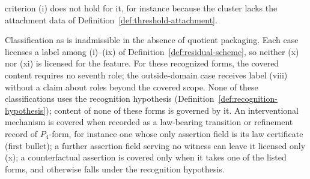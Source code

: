 \begin{proposition}
\begin{itemize}[topsep=2pt,itemsep=1pt]
    criterion (i) does not hold for it, for instance because the cluster lacks
    the attachment data of Definition~\ref{def:threshold-attachment}.
\end{itemize}
Classification as \Pfive{} is inadmissible in the absence of quotient
packaging. Each case licenses a label among (i)--(ix) of
Definition~\ref{def:residual-scheme}, so neither (x) nor (xi) is licensed for
the feature. For these recognized forms, the covered content requires no
seventh role; the outside-domain case receives label (viii) without a claim
about roles beyond the covered scope. None of these classifications uses the
recognition hypothesis (Definition~\ref{def:recognition-hypothesis}); content
of none of these forms is governed by it. An interventional mechanism is covered
when recorded as a law-bearing transition or refinement record of \(P_4\)-form, for instance one whose only assertion field is its law certificate (first bullet); a further assertion field serving no witness can leave it licensed only (x); a
counterfactual assertion is covered only when it takes one of the listed forms,
and otherwise falls under the recognition hypothesis.
\end{proposition}

